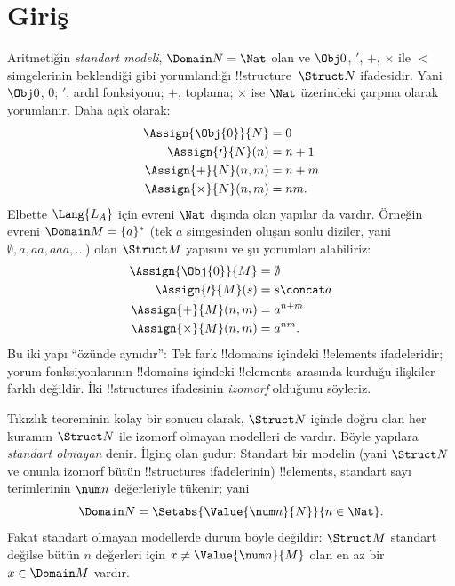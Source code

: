 \documentclass[../../../include/open-logic-section]{subfiles}
\begin{document}
\section{Giriş}

Aritmetiğin \emph{standart modeli}, $\Domain N=\Nat$ olan ve
$\Obj0$, $\prime$, $+$, $\times$ ile $<$ simgelerinin beklendiği gibi
yorumlandığı !!{structure}~$\Struct N$ ifadesidir. Yani $\Obj0$, $0$;
$\prime$, ardıl fonksiyonu; $+$, toplama; $\times$ ise $\Nat$
üzerindeki çarpma olarak yorumlanır. Daha açık olarak:
\begin{align*}
  \Assign{\Obj{0}}{N} & = 0\\
  \Assign{\prime}{N}(n) & = n + 1\\
  \Assign{+}{N}(n, m) & = n + m\\
  \Assign{\times}{N}(n, m) & = nm.
\end{align*}
Elbette $\Lang{L_A}$ için evreni $\Nat$ dışında olan yapılar da
vardır. Örneğin evreni $\Domain M=\{a\}^*$ (tek $a$ simgesinden oluşan
sonlu diziler, yani $\emptyset,a,aa,aaa,\dots$) olan $\Struct M$
yapısını ve şu yorumları alabiliriz:
\begin{align*}
  \Assign{\Obj{0}}{M} & = \emptyset\\
  \Assign{\prime}{M}(s) & = s \concat a\\
  \Assign{+}{M}(n, m) & = a^{n + m}\\
  \Assign{\times}{M}(n, m) & = a^{nm}.
\end{align*}
Bu iki yapı ``özünde aynıdır'': Tek fark !!{domain}s içindeki
!!{element}s ifadeleridir; yorum fonksiyonlarının !!{domain}s
içindeki !!{element}s arasında kurduğu ilişkiler farklı değildir.
İki !!{structure}s ifadesinin \emph{izomorf} olduğunu söyleriz.

Tıkızlık teoreminin kolay bir sonucu olarak, $\Struct N$ içinde doğru
olan her kuramın $\Struct N$ ile izomorf olmayan modelleri de vardır.
Böyle yapılara \emph{standart olmayan} denir. İlginç olan şudur:
Standart bir modelin (yani $\Struct N$ ve onunla izomorf bütün
!!{structure}s ifadelerinin) !!{element}s, standart sayı terimlerinin
$\num n$ değerleriyle tükenir; yani
\[
\Domain N=\Setabs{\Value{\num n}{N}}{n\in\Nat}.
\]
Fakat standart olmayan modellerde durum böyle değildir: $\Struct M$
standart değilse bütün $n$ değerleri için
$x\neq\Value{\num n}{M}$ olan en az bir $x\in\Domain M$ vardır.
\end{document}
